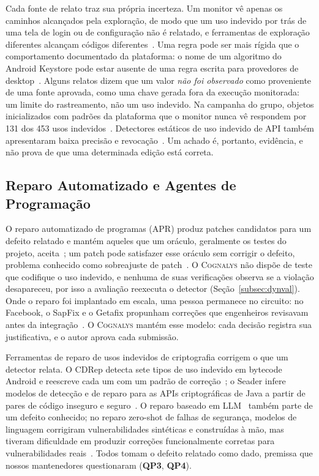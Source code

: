 \documentclass[conference]{IEEEtran}
\newcommand{\system}{\textsc{Cognalys}}
\newcommand{\researchq}[1]{\textbf{QP#1}}
\begin{document}
Cada fonte de relato traz sua própria incerteza. Um monitor vê apenas os
caminhos alcançados pela exploração, de modo que um uso indevido por trás de uma
tela de login ou de configuração não é relatado, e ferramentas de exploração
diferentes alcançam códigos diferentes~\cite{costa2026effectiveness}. Uma regra pode ser mais rígida que o
comportamento documentado da plataforma: o nome de um algoritmo do Android
Keystore pode estar ausente de uma regra escrita para provedores de desktop~\cite{costa2026effectiveness}.
Alguns relatos dizem que um valor \emph{não foi observado} como proveniente de uma fonte
aprovada, como uma chave gerada fora da execução monitorada: um limite do
rastreamento, não um uso indevido. Na campanha do grupo, objetos inicializados com
padrões da plataforma que o monitor nunca vê respondem por 131 dos 453 usos
indevidos~\cite{costa2026effectiveness}. Detectores estáticos de uso indevido de API também apresentaram
baixa precisão e revocação~\cite{amann2019evaluation}. Um achado é, portanto, evidência, e não
prova de que uma determinada edição está correta.

\subsection{Reparo Automatizado e Agentes de Programação}
\label{subsec:apr}

O reparo automatizado de programas (APR) produz patches candidatos para um
defeito relatado e mantém aqueles que um oráculo, geralmente os testes do
projeto, aceita~\cite{legoues2019apr}; um patch pode satisfazer esse oráculo sem
corrigir o defeito, problema conhecido como sobreajuste de
patch~\cite{smith2015overfitting}. O \system{} não dispõe de teste que codifique
o uso indevido, e nenhuma de suas verificações observa se a violação
desapareceu, por isso a avaliação reexecuta o detector (Seção~\ref{subsec:dynval}). Onde o reparo foi implantado em escala, uma pessoa
permanece no circuito: no Facebook, o SapFix e o Getafix propunham correções que
engenheiros revisavam antes da integração~\cite{marginean2019sapfix,bader2019getafix}.
O \system{} mantém esse modelo: cada decisão registra sua justificativa, e o
autor aprova cada submissão.

Ferramentas de reparo de usos indevidos de criptografia corrigem o que um
detector relata. O CDRep detecta sete tipos de uso indevido em bytecode Android
e reescreve cada um com um padrão de correção~\cite{ma2016cdrep}; o Seader
infere modelos de detecção e de reparo para as APIs criptográficas de Java a
partir de pares de código inseguro e seguro~\cite{zhang2022seader}. O reparo
baseado em LLM~\cite{xia2023apr,zhang2023apimisuse} também parte de um defeito
conhecido; no reparo zero-shot de falhas de segurança, modelos de linguagem
corrigiram vulnerabilidades sintéticas e construídas à mão, mas tiveram
dificuldade em produzir correções funcionalmente corretas para vulnerabilidades
reais~\cite{pearce2023zeroshot}. Todos tomam o defeito relatado como dado,
premissa que nossos mantenedores questionaram (\researchq{3}, \researchq{4}).
\end{document}
